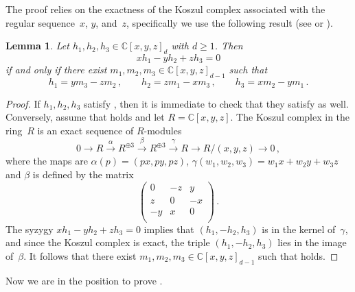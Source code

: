\documentclass[a4paper, 11pt, reqno]{amsart}
\theoremstyle{plain}
\newtheorem{lemma}{Lemma}[section]
\theoremstyle{definition}
\newcommand{\C}{\mathbb{C}}
\begin{document}
The proof relies on the exactness of the Koszul complex associated with the regular sequence~$x$, $y$, and~$z$, specifically we use the following result (see \cite[Theorem~7.3.13]{Dolgachev} or \cite[Lemma~3.9]{BGV}).

\begin{lemma}
\label{lem:Koszul}
Let $h_1,h_2,h_3\in\C[x,y,z]_d$ with $d \ge 1$. Then
%
\begin{equation}
\label{eq:linear_relazion}
  xh_1-yh_2+zh_3 = 0
\end{equation}
%
if and only if there exist $m_1,m_2,m_3\in\C[x,y,z]_{d-1}$ such that
%
\begin{equation}
\label{eq:minors_lemma}
  h_1 = ym_3-zm_2 \,, \qquad
  h_2 = zm_1-xm_3 \,, \qquad
  h_3 = xm_2-ym_1 \,.
\end{equation}
%
\end{lemma}

\begin{proof}
If $h_1,h_2,h_3$ satisfy , then it is immediate to check that they satisfy  as well. 
Conversely, assume that  holds and let $R = \C[x,y,z]$.
The Koszul complex in the ring~$R$ is an exact sequence of $R$-modules
%
\[
  0 \to R\xrightarrow{\alpha} R^{\oplus 3} \xrightarrow{\beta} R^{\oplus 3} \xrightarrow{\gamma} R \to R/(x,y,z) \to 0 \,,
\]
%
where the maps are $\alpha(p) = (p x, p y, p z)$, $\gamma (w_1,w_2,w_3) = w_1 x + w_2 y + w_3 z$ and $\beta$ is defined by the matrix
%
\[
  \left(
  \begin{array}{ccc}
    0 & -z & y\\
    z & 0 & -x\\
    -y & x & 0 \\
  \end{array}
  \right) \,.
\]
%
The syzygy $xh_1-yh_2+zh_3=0$ implies that $(h_1, -h_2, h_3)$ is in the kernel of~$\gamma$,
and since the Koszul complex is exact, the triple $(h_1,-h_2, h_3)$ lies in the image of~$\beta$.
It follows that there exist $m_1,m_2,m_3 \in \C[x,y,z]_{d-1}$ such that  holds.
\end{proof}

Now we are in the position to prove .
\end{document}
